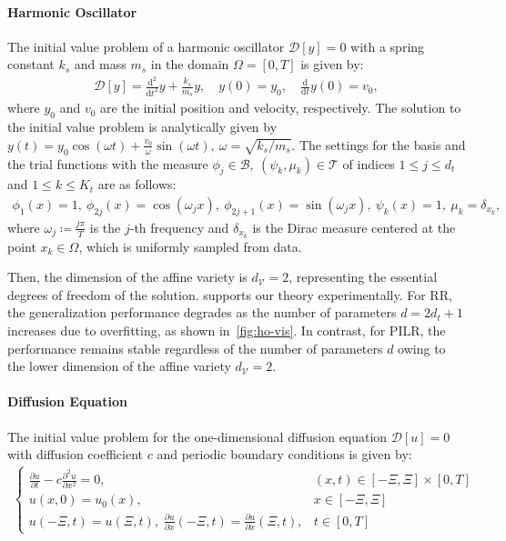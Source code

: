 \documentclass{article}
\theoremstyle{plain}
\theoremstyle{definition}
\theoremstyle{remark}
\begin{document}
\paragraph{Harmonic Oscillator} The initial value problem of a harmonic oscillator \(\mathscr{D}[y]=0\) with a spring constant \( k_s \) and mass \( m_s \) in the domain \( \Omega = [0, T] \) is given by:
\begin{align}
    \label{eq:osc-eq}
    \mathscr{D}[y] = \frac{\mathrm{d}^2}{\mathrm{d}t^2}y + \frac{k_s}{m_s}y,\quad y(0)=y_0,\quad \frac{\mathrm{d}}{\mathrm{d}t}y(0)=v_0,
\end{align}
where \(y_0\) and \(v_0\) are the initial position and velocity, respectively. The solution to the initial value problem is analytically given by \( y(t) = y_0 \cos(\omega t) + \frac{v_0}{\omega} \sin(\omega t), \ \omega = \sqrt{k_s/m_s} \). 
The settings for the basis and the trial functions with the measure \(\phi_j \in \mathcal{B},\ (\psi_k, \mu_k) \in \mathcal{T}\) of indices \(1 \leq j \leq d_t\) and \(1 \leq k \leq K_t \) are as follows:
\begin{align}
    \label{eq:basis_test_osc}
    \phi_1(x) = 1,\ \phi_{2j}(x) = \cos\left(\omega_j x\right),\ 
    \phi_{2j+1}(x) = \sin\left(\omega_j x\right),\
    \psi_k(x) = 1,\ \mu_k = \delta_{x_k},
\end{align}
where \(\omega_j \coloneqq \frac{j\pi}{T}\) is the \(j\)-th frequency and \(\delta_{x_k}\) is the Dirac measure centered at the point \(x_k \in \Omega\), which is uniformly sampled from data. 

Then, the dimension of the affine variety is \( d_{\mathcal{V}} = 2\), representing the essential degrees of freedom of the solution. \Cref{fig:ho-perf} supports our theory experimentally. For RR, the generalization performance degrades as the number of parameters \( d = 2d_t + 1 \) increases due to overfitting, as shown in~\cref{fig:ho-vis}. In contrast, for PILR, the performance remains stable regardless of the number of parameters \( d \) owing to the lower dimension of the affine variety \( d_{\mathcal{V}} = 2 \).

\paragraph{Diffusion Equation} The initial value problem for the one-dimensional diffusion equation \(\mathscr{D}[u]=0\) with diffusion coefficient \( c \) and periodic boundary conditions is given by:
\begin{align}
\label{eq:diffusion-eq}
\begin{cases}
 \frac{\partial u}{\partial t} -c \frac{\partial^2 u}{\partial x^2}= 0,
 & (x,t)\in[-\Xi,\Xi]\times[0,T] \\
 u(x,0)=u_0(x),
 & x\in[-\Xi,\Xi] \\
 u(-\Xi,t) = u(\Xi,t),\;
 \frac{\partial u}{\partial x}(-\Xi,t) = \frac{\partial u}{\partial x}(\Xi,t),
 & t\in[0,T]
\end{cases}
\end{align}
\end{document}
